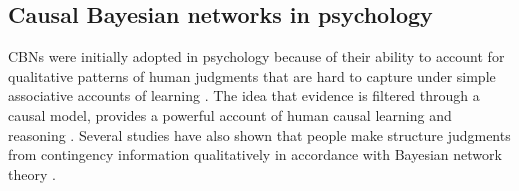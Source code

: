 \documentclass{cambridge7A}%
\newcommand{\ttodo}[2][]{\vspace{0.1cm} \hfil \todo[caption={\textbf{TG}}, size=\footnotesize, color = orange, inline, #1]{#2}}
\begin{document}
\subsection{Causal Bayesian networks in psychology}

CBNs were initially adopted in psychology because of their ability to account for qualitative patterns of human judgments that are hard to capture under simple associative accounts of learning \citep[e.g.,][]{rescorla1972theory,holyoak2011causal,waldmann1992predictive,waldmann1998bayesian}.  %
The idea that evidence is filtered through a causal model, provides a powerful account of human causal learning and reasoning \citep{cheng1997from,waldmann2000competition,griffiths2005structure}.  Several studies have also shown that people make structure judgments  from contingency information qualitatively in accordance with Bayesian network theory \citep{steyvers2009bayesian,mayrhofer2016sufficiency,rothe2018successful}.  
\end{document}
